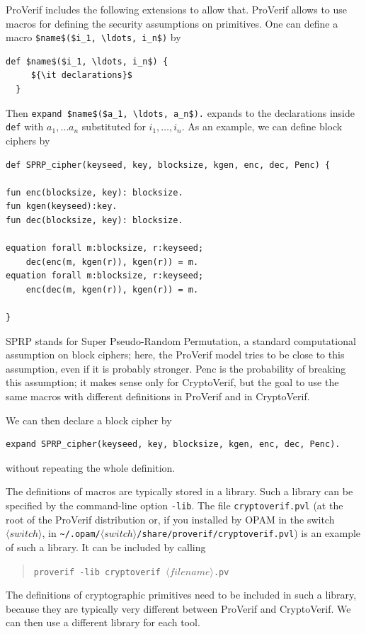 \documentclass{book}
\newcommand{\nonterm}[1]{\langle\mathit{#1}\rangle}
\newcommand{\filenamevar}{\nonterm{filename}}
\newcommand{\switchdir}{\nonterm{switch}}
\newcommand{\opamsubdir}[1]{\nolinkurl{~/.opam/}$\switchdir$\nolinkurl{/#1}}
\begin{document}
ProVerif includes the following extensions to allow that.
ProVerif allows to use macros for defining the security assumptions
on primitives. One can define a macro \lstinline!$name$($i_1, \ldots, i_n$)!
by
\begin{lstlisting}[numbers=none]
  def $name$($i_1, \ldots, i_n$) {
     ${\it declarations}$
  }
\end{lstlisting}
Then \lstinline!expand $name$($a_1, \ldots, a_n$).! expands to
the declarations inside \lstinline!def! with $a_1, \ldots a_n$
substituted for $i_1, \ldots, i_n$. As an example, we can define
block ciphers by
\begin{lstlisting}[numbers=none]
def SPRP_cipher(keyseed, key, blocksize, kgen, enc, dec, Penc) {

fun enc(blocksize, key): blocksize.
fun kgen(keyseed):key.
fun dec(blocksize, key): blocksize.

equation forall m:blocksize, r:keyseed;
	dec(enc(m, kgen(r)), kgen(r)) = m.
equation forall m:blocksize, r:keyseed;
	enc(dec(m, kgen(r)), kgen(r)) = m.

}
\end{lstlisting}
SPRP stands for Super Pseudo-Random Permutation, a standard computational
assumption on block ciphers; here, the ProVerif model tries to be close
to this assumption, even if it is probably stronger. Penc is the
probability of breaking this assumption; it makes sense only for CryptoVerif,
but the goal to use the same macros with different definitions in
ProVerif and in CryptoVerif.

We can then declare a block cipher by
\begin{lstlisting}[numbers=none]
  expand SPRP_cipher(keyseed, key, blocksize, kgen, enc, dec, Penc).
\end{lstlisting}
without repeating the whole definition.

The definitions of macros are typically stored in a library.
Such a library can be specified by the command-line option {\tt -lib}.
The file {\tt cryptoverif.pvl} (at the root of the ProVerif distribution or, if you installed by OPAM
in the switch $\switchdir$, in \opamsubdir{share/proverif/cryptoverif.pvl})
is an example of such a library. It can be included by calling
\begin{quote}
  \texttt{proverif -lib cryptoverif $\filenamevar$.pv}
\end{quote}
The definitions of cryptographic primitives need to be included
in such a library, because they are typically very different between
ProVerif and CryptoVerif. We can then use a different library
for each tool.
\end{document}
